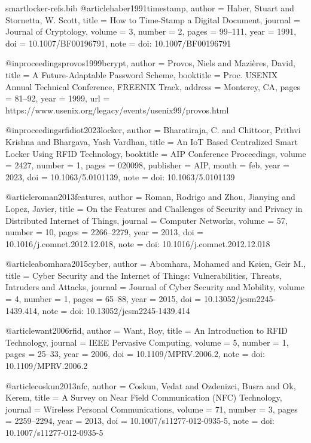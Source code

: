 \begin{filecontents*}[overwrite]{smartlocker-refs.bib}
@article{haber1991timestamp,
  author  = {Haber, Stuart and Stornetta, W. Scott},
  title   = {How to Time-Stamp a Digital Document},
  journal = {Journal of Cryptology},
  volume  = {3},
  number  = {2},
  pages   = {99--111},
  year    = {1991},
  doi     = {10.1007/BF00196791},
  note    = {doi: 10.1007/BF00196791}
}

@inproceedings{provos1999bcrypt,
  author    = {Provos, Niels and Mazi{\`e}res, David},
  title     = {A Future-Adaptable Password Scheme},
  booktitle = {Proc. USENIX Annual Technical Conference, FREENIX Track},
  address   = {Monterey, CA},
  pages     = {81--92},
  year      = {1999},
  url       = {https://www.usenix.org/legacy/events/usenix99/provos.html}
}

@inproceedings{rfidiot2023locker,
  author    = {Bharatiraja, C. and Chittoor, Prithvi Krishna and Bhargava, Yash Vardhan},
  title     = {An {IoT} Based Centralized Smart Locker Using {RFID} Technology},
  booktitle = {AIP Conference Proceedings},
  volume    = {2427},
  number    = {1},
  pages     = {020098},
  publisher = {AIP},
  month     = feb,
  year      = {2023},
  doi       = {10.1063/5.0101139},
  note      = {doi: 10.1063/5.0101139}
}

@article{roman2013features,
  author  = {Roman, Rodrigo and Zhou, Jianying and Lopez, Javier},
  title   = {On the Features and Challenges of Security and Privacy in Distributed {Internet of Things}},
  journal = {Computer Networks},
  volume  = {57},
  number  = {10},
  pages   = {2266--2279},
  year    = {2013},
  doi     = {10.1016/j.comnet.2012.12.018},
  note    = {doi: 10.1016/j.comnet.2012.12.018}
}

@article{abomhara2015cyber,
  author  = {Abomhara, Mohamed and K{\o}ien, Geir M.},
  title   = {Cyber Security and the {Internet of Things}: Vulnerabilities, Threats, Intruders and Attacks},
  journal = {Journal of Cyber Security and Mobility},
  volume  = {4},
  number  = {1},
  pages   = {65--88},
  year    = {2015},
  doi     = {10.13052/jcsm2245-1439.414},
  note    = {doi: 10.13052/jcsm2245-1439.414}
}

@article{want2006rfid,
  author  = {Want, Roy},
  title   = {An Introduction to {RFID} Technology},
  journal = {IEEE Pervasive Computing},
  volume  = {5},
  number  = {1},
  pages   = {25--33},
  year    = {2006},
  doi     = {10.1109/MPRV.2006.2},
  note    = {doi: 10.1109/MPRV.2006.2}
}

@article{coskun2013nfc,
  author  = {Coskun, Vedat and Ozdenizci, Busra and Ok, Kerem},
  title   = {A Survey on Near Field Communication ({NFC}) Technology},
  journal = {Wireless Personal Communications},
  volume  = {71},
  number  = {3},
  pages   = {2259--2294},
  year    = {2013},
  doi     = {10.1007/s11277-012-0935-5},
  note    = {doi: 10.1007/s11277-012-0935-5}
}


\end{filecontents*}
